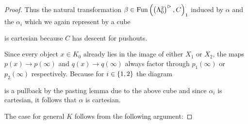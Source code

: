 \begin{lemma}
\begin{proof}
        Thus the natural transformation $\beta\in\operatorname{Fun}\left(\left(\Lambda_0^2\right)^{\rhd}, C\right)_1$ induced by $\alpha$ and the $\alpha_i$ which we again represent by a cube
        \begin{center}
        \end{center}
        is cartesian because $C$ has descent for pushouts.

        Since every object $x\in K_0$ already lies in the image of either $X_1$ or $X_2$, the maps $p(x)\to p(\infty)$ and $q(x)\to q(\infty)$ always factor through $p_1(\infty)$ or $p_2(\infty)$ respectively.
        Because for $i\in\left\lbrace1,2\right\rbrace$ the diagram
        \begin{center}
        \end{center}
        is a pullback by the pasting lemma due to the above cube and since $\alpha_i$ is cartesian, it follows that $\alpha$ is cartesian.

        The case for general $K$ follows from the following argument:


\end{proof}
\end{lemma}
